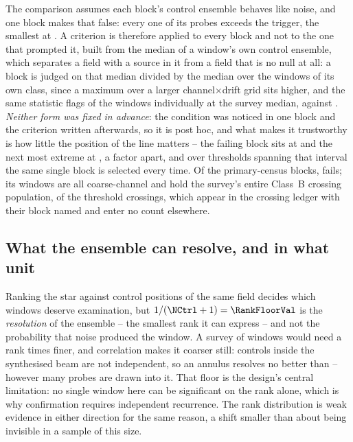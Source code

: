 The comparison assumes each block's control ensemble behaves like noise, and
one block makes that false: every one of its \NCtrl{} probes exceeds the
trigger, the smallest at \BqFailCtrlMin. A criterion is therefore applied to
every block and not to the one that prompted it, built from the median of a
window's own control ensemble, which separates a field with a source in it
from a field that is no null at all: a block is judged on that median divided
by the median over the windows of its own class, since a maximum over a
larger channel$\times$drift grid sits higher, and the same statistic flags
\DqNWin{} of the \NWindows{} windows individually at \BqFactor{} the survey
median, \DqThresh{} against \DqSurvMed. \emph{Neither form was fixed in
advance}: the condition was noticed in one block and the criterion written
afterwards, so it is post hoc, and what makes it trustworthy is how little
the position of the line matters -- the failing block sits at \BqFailQ{} and
the next most extreme at \BqNextQ, a factor \QsRatio{} apart, and over
\QsNStep{} thresholds spanning that interval the same single block is
selected every time. Of the \BqNBlocks{} primary-census blocks, \BqNFail{}
fails; its \BqFailNWin{} windows are all coarse-channel and hold the survey's
entire Class~B crossing population, \EvNCrossFlag{} of the \EvNCrossRaw{}
threshold crossings, which appear in the crossing ledger with their block
named and enter no count elsewhere.

\subsection{What the ensemble can resolve, and in what unit}

Ranking the star against \NCtrl{} control positions of the same field decides
which windows deserve examination, but $1/(\NCtrl+1)=\RankFloorVal$ is the
\emph{resolution} of the ensemble -- the smallest rank it can express -- and
not the probability that noise produced the window. A survey of \NWindows{}
windows would need a rank \BonfRankRatio{} times finer, and correlation makes
it coarser still: controls inside the synthesised beam are not independent,
so an annulus resolves no better than \RankEffLo--\RankEffHi{} however many
probes are drawn into it. That floor is the design's central limitation: no
single window here can be significant on the rank alone, which is why
confirmation requires independent recurrence. The rank distribution is weak
evidence in either direction for the same reason, a shift smaller than about
\VerKsPowerAca{} being invisible in a sample of this size.

